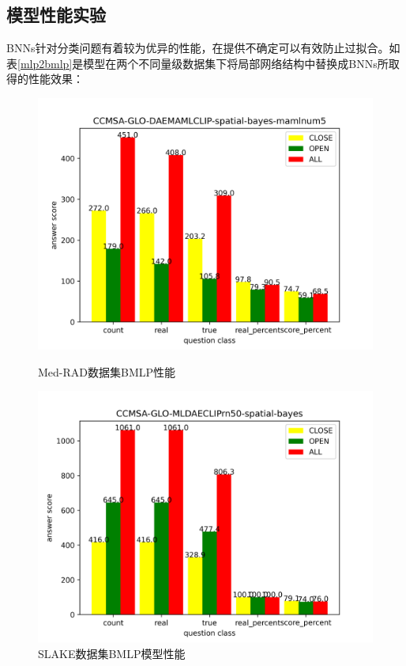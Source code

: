 \subsection{模型性能实验}
BNNs针对分类问题有着较为优异的性能，在提供不确定可以有效防止过拟合。如表\ref{mlp2bmlp}是模型在两个不同量级数据集下将局部网络结构中替换成BNNs所取得的性能效果：
\begin{figure}[htbp]
	\begin{minipage}{0.5\linewidth}
		\centering	
		\includegraphics[width=1\textwidth]{Fig/myfig/chapter4/modal_bayes_medrad.png}  %
		\caption{\label{modal_bayes_medrad}Med-RAD数据集BMLP性能} 	
	\end{minipage}
	\begin{minipage}{0.5\linewidth}
		\centering	
		\includegraphics[width=1\textwidth]{Fig/myfig/chapter4/modal_bayes_slake.png}  %
		\caption{\label{modal_bayes_slake}SLAKE数据集BMLP模型性能} 	
	\end{minipage}	
\end{figure}

